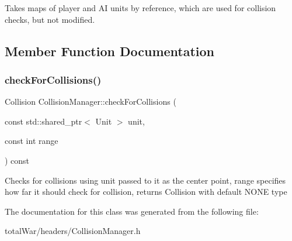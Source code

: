 Takes maps of player and AI units by reference, which are used for collision checks, but not modified. 

\subsection{Member Function Documentation}
\mbox{\label{class_collision_manager_abb428398c7e6da1d13a68f94b7657741}} 
\subsubsection{\texorpdfstring{check\+For\+Collisions()}{checkForCollisions()}}
{\footnotesize\ttfamily Collision Collision\+Manager\+::check\+For\+Collisions (\begin{DoxyParamCaption}\item[{const std\+::shared\+\_\+ptr$<$ Unit $>$}]{unit,  }\item[{const int}]{range }\end{DoxyParamCaption}) const}

Checks for collisions using unit passed to it as the center point, range specifies how far it should check for collision, returns Collision with default N\+O\+NE type 

The documentation for this class was generated from the following file\+:\begin{DoxyCompactItemize}
\item 
total\+War/headers/Collision\+Manager.\+h\end{DoxyCompactItemize}
